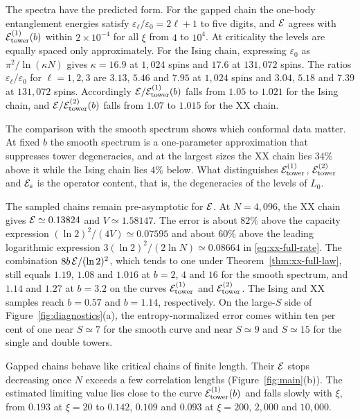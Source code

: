 The spectra have the predicted form. For the gapped chain the one-body entanglement energies
satisfy $\varepsilon_\ell/\varepsilon_0=2\ell+1$ to five digits, and $\mathcal{E}$ agrees with $\mathcal{E}_{\mathrm{tower}}^{(1)}(b)$
within $2\times10^{-4}$ for all $\xi$ from $4$ to $10^4$. At criticality the levels are equally
spaced only approximately. For the Ising chain, expressing $\varepsilon_0$
as $\pi^2/\ln(\kappa N)$ gives $\kappa=16.9$ at $1{,}024$ spins and
$17.6$ at $131{,}072$ spins. The ratios
$\varepsilon_\ell/\varepsilon_0$ for $\ell=1,2,3$ are $3.13$, $5.46$ and $7.95$
at $1{,}024$ spins and $3.04$, $5.18$ and $7.39$ at $131{,}072$ spins.
Accordingly $\mathcal{E}/\mathcal{E}_{\mathrm{tower}}^{(1)}(b)$ falls from $1.05$ to $1.021$ for the Ising chain, and
$\mathcal{E}/\mathcal{E}_{\mathrm{tower}}^{(2)}(b)$ falls from $1.07$ to $1.015$ for the XX chain.

The comparison with the smooth spectrum shows which conformal data matter. At fixed $b$ the smooth spectrum is a one-parameter approximation that suppresses tower degeneracies, and at the largest sizes the XX chain lies $34\%$ above it
while the Ising chain lies $4\%$ below. What distinguishes $\mathcal{E}_{\mathrm{tower}}^{(1)}$, $\mathcal{E}_{\mathrm{tower}}^{(2)}$ and
$\mathcal{E}_{\mathrm{s}}$ is the operator content, that is, the degeneracies of the levels of $L_0$.

The sampled chains remain pre-asymptotic for $\mathcal{E}$. At $N=4{,}096$,
the XX chain gives $\mathcal{E}\simeq0.13824$ and $V\simeq1.58147$.
The error is about $82\%$ above the capacity expression
$(\ln2)^2/(4V)\simeq0.07595$ and about $60\%$ above the leading
logarithmic expression $3(\ln2)^2/(2\ln N)\simeq0.08664$ in
\eqref{eq:xx-full-rate}.
The combination $8b\,\mathcal{E}/(\ln2)^2$, which tends to one under
Theorem~\ref{thm:xx-full-law}, still equals $1.19$, $1.08$ and
$1.016$ at $b=2$, $4$ and $16$ for the smooth spectrum, and $1.14$ and $1.27$ at $b=3.2$ on the
curves $\mathcal{E}_{\mathrm{tower}}^{(1)}$ and $\mathcal{E}_{\mathrm{tower}}^{(2)}$.
The Ising and XX samples reach $b=0.57$ and $b=1.14$, respectively.
On the large-$S$ side of Figure~\ref{fig:diagnostics}(a), the
entropy-normalized error comes within ten per cent of one near
$S\simeq7$ for the smooth curve and near $S\simeq9$ and $S\simeq15$
for the single and double towers.

Gapped chains behave like critical chains of finite length. Their $\mathcal{E}$ stops decreasing once
$N$ exceeds a few correlation lengths (Figure~\ref{fig:main}(b)). The estimated limiting value lies close to
the curve $\mathcal{E}_{\mathrm{tower}}^{(1)}(b)$ and falls slowly with $\xi$, from $0.193$ at $\xi=20$ to $0.142$, $0.109$
and $0.093$ at $\xi=200$, $2{,}000$ and $10{,}000$.


